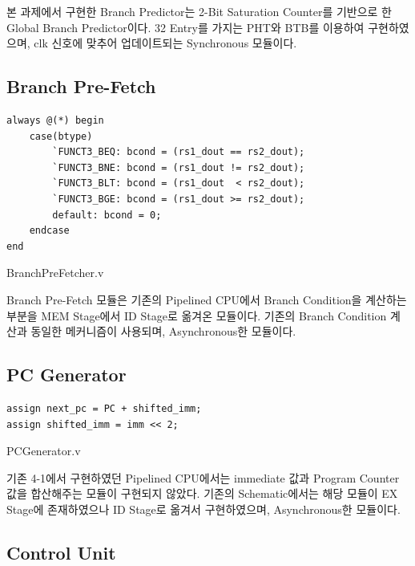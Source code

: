 \documentclass[openright, a4paper]{article}
\newenvironment{longlisting}{\captionsetup{type=listing}}{}
\begin{document}
본 과제에서 구현한 Branch Predictor는 2-Bit Saturation Counter를 기반으로 한 Global Branch Predictor이다.
32 Entry를 가지는 PHT와 BTB를 이용하여 구현하였으며, clk 신호에 맞추어 업데이트되는 Synchronous 모듈이다. \\

\subsection{Branch Pre-Fetch}

\begin{longlisting}
    \begin{verbatim}
always @(*) begin
    case(btype)
        `FUNCT3_BEQ: bcond = (rs1_dout == rs2_dout);
        `FUNCT3_BNE: bcond = (rs1_dout != rs2_dout);
        `FUNCT3_BLT: bcond = (rs1_dout  < rs2_dout);
        `FUNCT3_BGE: bcond = (rs1_dout >= rs2_dout);
        default: bcond = 0;
    endcase
end
    \end{verbatim}
    \caption{BranchPreFetcher.v}
\end{longlisting}

Branch Pre-Fetch 모듈은 기존의 Pipelined CPU에서 Branch Condition을 계산하는 부분을 MEM Stage에서 ID Stage로 옮겨온 모듈이다.
기존의 Branch Condition 계산과 동일한 메커니즘이 사용되며, Asynchronous한 모듈이다. \\

\subsection{PC Generator}

\begin{longlisting}
    \begin{verbatim}
assign next_pc = PC + shifted_imm;
assign shifted_imm = imm << 2;
    \end{verbatim}
    \caption{PCGenerator.v}
\end{longlisting}

기존 4-1에서 구현하였던 Pipelined CPU에서는 immediate 값과 Program Counter 값을 합산해주는 모듈이 구현되지 않았다.
기존의 Schematic에서는 해당 모듈이 EX Stage에 존재하였으나 ID Stage로 옮겨서 구현하였으며, Asynchronous한 모듈이다. \\

\subsection{Control Unit}
\end{document}
